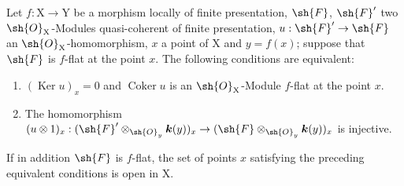 \begin{proposition}[11.3.7]
\label{IV.11.3.7}
Let $f:\mathrm{X}\to\mathrm{Y}$ be a morphism locally of finite presentation, $\sh{F}$, $\sh{F}'$ two $\sh{O}_\mathrm{X}$-Modules quasi-coherent of finite presentation, $u:\sh{F}'\to\sh{F}$ an $\sh{O}_\mathrm{X}$-homomorphism, $x$ a point of $\mathrm{X}$ and $y=f(x)$; suppose that $\sh{F}$ is $f$-flat at the point $x$. The following conditions are equivalent:
\begin{enumerate}[label=\emph{\alph*)}]
  \item $(\operatorname{Ker} u)_x=0$ and $\operatorname{Coker} u$ is an $\sh{O}_\mathrm{X}$-Module $f$-flat at the point $x$.
  \item The homomorphism $(u\otimes 1)_x:(\sh{F}'\otimes_{\sh{O}_y}\boldsymbol{k}(y))_x\to(\sh{F}\otimes_{\sh{O}_y}\boldsymbol{k}(y))_x$ is injective.
\end{enumerate}
If in addition $\sh{F}$ is $f$-flat, the set of points $x$ satisfying the preceding equivalent conditions is open in $\mathrm{X}$.
\end{proposition}

